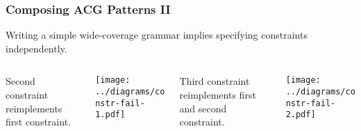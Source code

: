 \documentclass{beamer}
\begin{document}
\begin{frame}
  \frametitle{Composing ACG Patterns II}

  Writing a simple wide-coverage grammar implies specifying constraints
  independently.

  \begin{columns}[c]
    \begin{column}{0.25\textwidth}
      Second constraint reimplements first constraint.

    \end{column}
    \begin{column}{0.25\textwidth}
      \begin{center}
        \texttt{[image: ../diagrams/constr-fail-1.pdf]}
      \end{center}
    \end{column}
    \begin{column}{0.25\textwidth}
      Third constraint reimplements first and second constraint.

    \end{column}
    \begin{column}{0.25\textwidth}
      \begin{center}
        \texttt{[image: ../diagrams/constr-fail-2.pdf]}
      \end{center}
    \end{column}
  \end{columns}
\end{frame}
\end{document}
